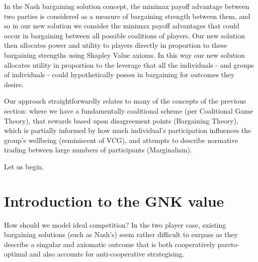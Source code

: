 In the Nash bargaining solution concept, the minimax payoff advantage between two parties is considered as a measure of bargaining strength between them, and so in our new solution we consider the minimax payoff advantages that could occur in bargaining between all possible coalitions of players.
Our new solution then allocates power and utility to players directly in proportion to these bargaining strengths using Shapley Value axioms.
In this way our new solution allocates utility in proportion to the leverage that all the individuals - and groups of individuals - could hypothetically posses in bargaining for outcomes they desire.

Our approach straightforwardly relates to many of the concepts of the previous section: where we have a fundamentally coalitional scheme (per Coalitional Game Theory), that rewards based upon disagreement points (Bargaining Theory), which is partially informed by how much individual's participation influences the group's wellbeing (reminiscent of VCG), and attempts to describe normative trading between large numbers of participants (Marginalism).



Let us begin.

\section{Introduction to the GNK value}

How should we model ideal competition? In the two player case, existing bargaining solutions (such as Nash's) seem rather difficult to surpass as they describe a singular and axiomatic outcome that is both cooperatively pareto-optimal and also accounts for anti-cooperative strategising.

